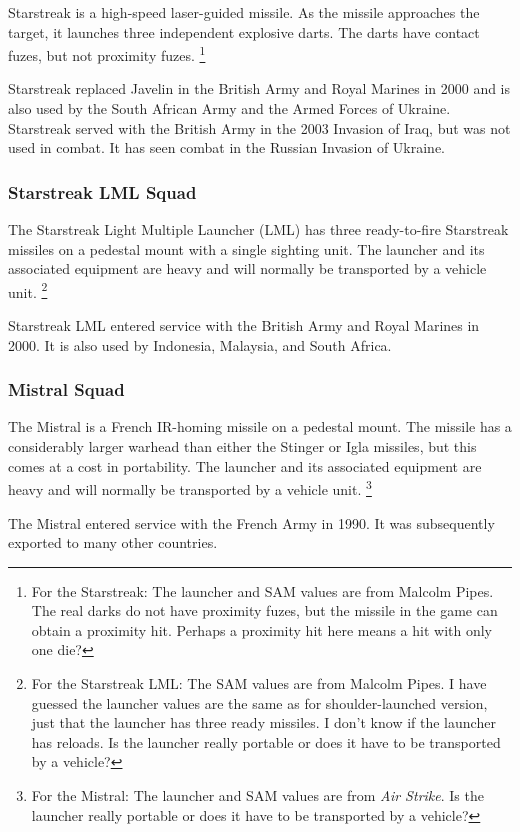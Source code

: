 \documentclass[10pt]{article}
\newcommand{\note}[1]{%
    \footnote{%
        \setlength{\parindent}{0pt}%
        \setlength{\parskip}{\smallskipamount}%
        #1
    }%
}
\begin{document}
Starstreak is a high-speed laser-guided missile. As the missile approaches the target, it launches three independent explosive darts. The darts have contact fuzes, but not proximity fuzes.%
\note{
    For the Starstreak: The launcher and SAM values are from Malcolm Pipes. The real darks do not have proximity fuzes, but the missile in the game can obtain a proximity hit. Perhaps a proximity hit here means a hit with only one die?
}

Starstreak replaced Javelin in the British Army and Royal Marines in 2000 and is also used by the South African Army and the Armed Forces of Ukraine.
Starstreak served with the British Army in the 2003 Invasion of Iraq, but was not used in combat. It has seen combat in the Russian Invasion of Ukraine.

\subsubsection{Starstreak LML Squad}

The Starstreak Light Multiple Launcher (LML) has three ready-to-fire Starstreak missiles on a pedestal mount with a single sighting unit. The launcher and its associated equipment are heavy and will normally be transported by a vehicle unit.%
\note{
    For the Starstreak LML: The SAM values are from Malcolm Pipes. I have guessed the launcher values are the same as for shoulder-launched version, just that the launcher has three ready missiles. I don't know if the launcher has reloads. Is the launcher really portable or does it have to be transported by a vehicle?
}

Starstreak LML entered service with the British Army and Royal Marines in 2000.
It is also used by Indonesia, Malaysia, and South Africa.

\subsubsection{Mistral Squad}

The Mistral is a French IR-homing missile on a pedestal mount. The missile has a considerably larger warhead than either the Stinger or Igla missiles, but this comes at a cost in portability. The launcher and its associated equipment are heavy and will normally be transported by a vehicle unit.%
\note{
    For the Mistral: The launcher and SAM values are from \emph{Air Strike}. Is the launcher really portable or does it have to be transported by a vehicle?
}

The Mistral entered service with the French Army in 1990. It was subsequently exported to many other countries.
\end{document}
